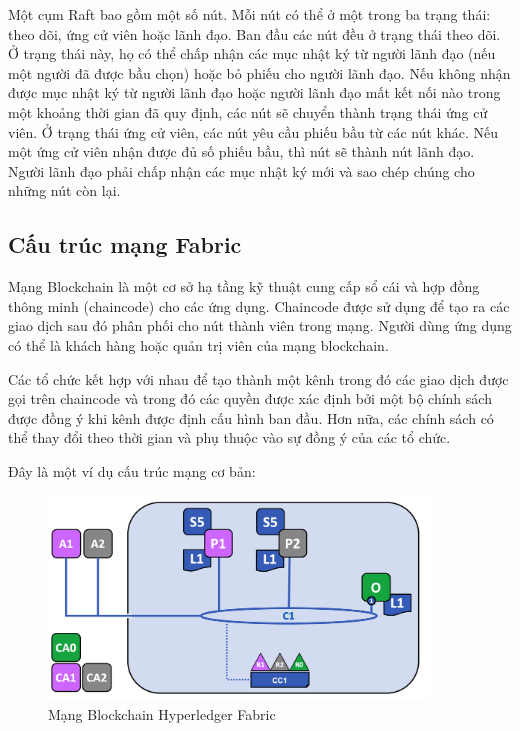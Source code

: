 Một cụm Raft bao gồm một số nút. Mỗi nút có thể ở một trong ba trạng thái: theo dõi, ứng cử viên hoặc 
lãnh đạo. Ban đầu các nút đều ở trạng thái theo dõi. Ở trạng thái này, họ có thể chấp nhận các mục nhật 
ký từ người lãnh đạo (nếu một người đã được bầu chọn) hoặc bỏ phiếu cho người lãnh đạo. Nếu không 
nhận được mục nhật ký từ người lãnh đạo hoặc người lãnh đạo mất kết nối nào trong một khoảng thời gian đã quy định, các nút sẽ chuyển thành 
trạng thái ứng cử viên. Ở trạng thái ứng cử viên, các nút yêu cầu phiếu bầu từ các nút khác. Nếu một 
ứng cử viên nhận được đủ số phiếu bầu, thì nút sẽ thành nút lãnh đạo. Người lãnh đạo phải chấp nhận 
các mục nhật ký mới và sao chép chúng cho những nút còn lại.


\subsection{Cấu trúc mạng Fabric}

Mạng Blockchain là một cơ sở hạ tầng kỹ thuật cung cấp sổ cái và hợp đồng thông minh (chaincode) cho các ứng dụng. 
Chaincode được sử dụng để tạo ra các giao dịch sau đó phân phối cho nút thành viên trong mạng. Người dùng ứng dụng
có thể là khách hàng hoặc quản trị viên của mạng blockchain.

Các tổ chức kết hợp với nhau để tạo thành một kênh trong đó các giao dịch được gọi 
trên chaincode và trong đó các quyền được xác định bởi một bộ chính sách được đồng ý 
khi kênh được định cấu hình ban đầu. Hơn nữa, các chính sách có thể thay đổi theo 
thời gian và phụ thuộc vào sự đồng ý của các tổ chức.

Đây là một ví dụ cấu trúc mạng cơ bản: 

\begin{figure}[h]
    \centering
    \includegraphics[width=0.9\textwidth]{images/network.png}
    \caption{Mạng Blockchain Hyperledger Fabric }
    \label{fig:network}
\end{figure}

